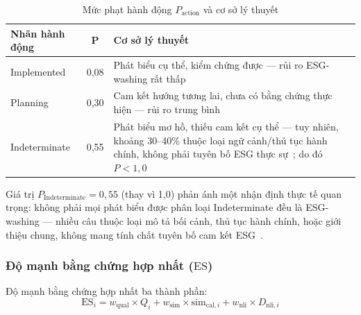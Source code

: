 \begin{table}[htbp]
\centering
\caption{Mức phạt hành động $P_{\text{action}}$ và cơ sở lý thuyết}
\label{tab:action_penalty}
\small
\renewcommand{\arraystretch}{1.3}
\begin{tabular}{|l|c|p{8cm}|}
\hline
\textbf{Nhãn hành động} & $\boldsymbol{P}$ & \textbf{Cơ sở lý thuyết} \\
\hline
Implemented & 0{,}08 & Phát biểu cụ thể, kiểm chứng được --- rủi ro ESG-washing rất thấp~\cite{lyon2015means, florstedt2025detecting} \\
\hline
Planning & 0{,}30 & Cam kết hướng tương lai, chưa có bằng chứng thực hiện --- rủi ro trung bình~\cite{marquis2016scrutiny} \\
\hline
Indeterminate & 0{,}55 & Phát biểu mơ hồ, thiếu cam kết cụ thể --- tuy nhiên, khoảng 30--40\% thuộc loại ngữ cảnh/thủ tục hành chính, không phải tuyên bố ESG thực sự~\cite{cho2007role}; do đó $P < 1{,}0$ \\
\hline
\end{tabular}
\end{table}

Giá trị $P_{\text{Indeterminate}} = 0{,}55$ (thay vì 1{,}0) phản ánh một nhận định thực tế quan trọng: không phải mọi phát biểu được phân loại Indeterminate đều là ESG-washing --- nhiều câu thuộc loại mô tả bối cảnh, thủ tục hành chính, hoặc giới thiệu chung, không mang tính chất tuyên bố cam kết ESG~\cite{cho2007role}.


\subsubsection{Độ mạnh bằng chứng hợp nhất ($\text{ES}$)}

Độ mạnh bằng chứng hợp nhất ba thành phần:
\begin{equation}
    \text{ES}_i = w_{\text{qual}} \times Q_i + w_{\text{sim}} \times \text{sim}_{\text{cal},i} + w_{\text{nli}} \times D_{\text{nli},i}
    \label{eq:evidence_strength}
\end{equation}


